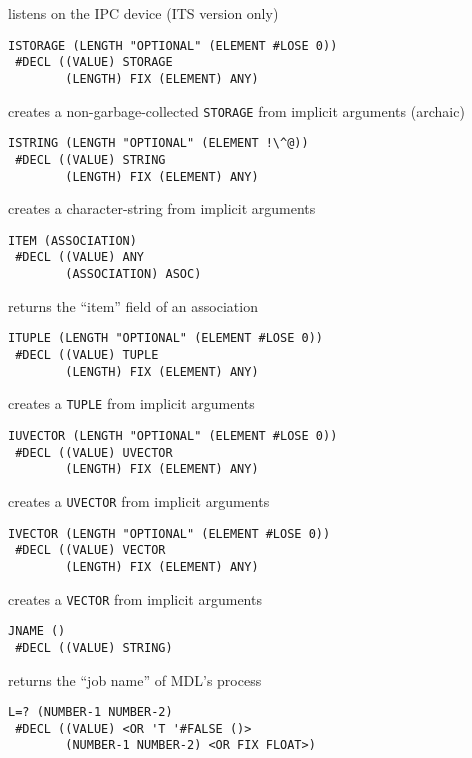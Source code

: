 \documentclass[a4paper,]{article}
\begin{document}
listens on the IPC device (ITS version only)

\begin{verbatim}
ISTORAGE (LENGTH "OPTIONAL" (ELEMENT #LOSE 0))
 #DECL ((VALUE) STORAGE
        (LENGTH) FIX (ELEMENT) ANY)
\end{verbatim}

 creates a non-garbage-collected \texttt{STORAGE} from implicit arguments (archaic)

\begin{verbatim}
ISTRING (LENGTH "OPTIONAL" (ELEMENT !\^@))
 #DECL ((VALUE) STRING
        (LENGTH) FIX (ELEMENT) ANY)
\end{verbatim}

creates a character-string from implicit arguments

\begin{verbatim}
ITEM (ASSOCIATION)
 #DECL ((VALUE) ANY
        (ASSOCIATION) ASOC)
\end{verbatim}

returns the ``item'' field of an association

\begin{verbatim}
ITUPLE (LENGTH "OPTIONAL" (ELEMENT #LOSE 0))
 #DECL ((VALUE) TUPLE
        (LENGTH) FIX (ELEMENT) ANY)
\end{verbatim}

creates a \texttt{TUPLE} from implicit arguments

\begin{verbatim}
IUVECTOR (LENGTH "OPTIONAL" (ELEMENT #LOSE 0))
 #DECL ((VALUE) UVECTOR
        (LENGTH) FIX (ELEMENT) ANY)
\end{verbatim}

creates a \texttt{UVECTOR} from implicit arguments

\begin{verbatim}
IVECTOR (LENGTH "OPTIONAL" (ELEMENT #LOSE 0))
 #DECL ((VALUE) VECTOR
        (LENGTH) FIX (ELEMENT) ANY)
\end{verbatim}

creates a \texttt{VECTOR} from implicit arguments

\begin{verbatim}
JNAME ()
 #DECL ((VALUE) STRING)
\end{verbatim}

returns the ``job name'' of MDL's process

\begin{verbatim}
L=? (NUMBER-1 NUMBER-2)
 #DECL ((VALUE) <OR 'T '#FALSE ()>
        (NUMBER-1 NUMBER-2) <OR FIX FLOAT>)
\end{verbatim}
\end{document}
